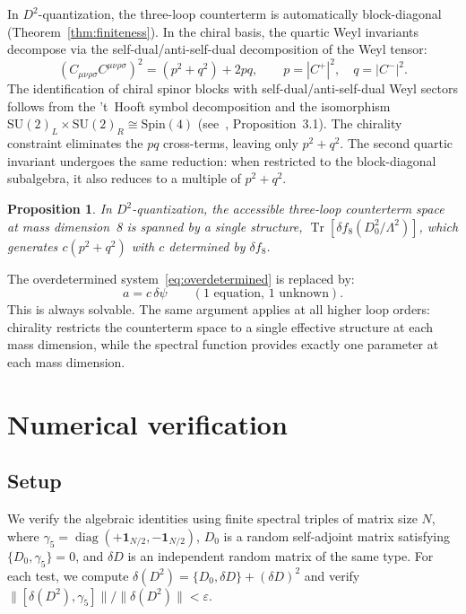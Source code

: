 \documentclass[12pt,a4paper]{article}
\newtheorem{proposition}[theorem]{Proposition}
\theoremstyle{definition}
\theoremstyle{remark}
\newcommand{\Weylsq}{C_{\mu\nu\rho\sigma}C^{\mu\nu\rho\sigma}}
\newcommand{\Tr}{\operatorname{Tr}}
\newcommand{\Lam}{\Lambda}
\begin{document}
In $D^2$-quantization, the three-loop counterterm is automatically
block-diagonal (Theorem~\ref{thm:finiteness}).  In the chiral basis, the
quartic Weyl invariants decompose via the self-dual/anti-self-dual
decomposition of the Weyl tensor:
\begin{equation}\label{eq:quartic_chiral}
  (\Weylsq)^2 = (p^2 + q^2) + 2pq, \qquad
  p = |C^+|^2, \quad q = |C^-|^2.
\end{equation}
The identification of chiral spinor blocks with self-dual/anti-self-dual
Weyl sectors follows from the 't~Hooft symbol decomposition and the
isomorphism $\mathrm{SU}(2)_L \times \mathrm{SU}(2)_R \cong
\mathrm{Spin}(4)$ (see~\cite{Alfyorov:2026ct}, Proposition~3.1).
The chirality constraint eliminates the $pq$ cross-terms, leaving only
$p^2 + q^2$.  The second quartic invariant undergoes the same reduction:
when restricted to the block-diagonal subalgebra, it also reduces to a
multiple of $p^2 + q^2$.

\begin{proposition}\label{prop:one_structure}
In $D^2$-quantization, the accessible three-loop counterterm space at mass
dimension~8 is spanned by a single structure, $\Tr[\delta f_8(D_0^2/\Lam^2)]$,
which generates $c(p^2 + q^2)$ with $c$ determined by $\delta f_8$.
\end{proposition}

The overdetermined system~\eqref{eq:overdetermined} is replaced by:
\begin{equation}\label{eq:determined}
  a = c\,\delta\psi \qquad (1\text{ equation, }1\text{ unknown}).
\end{equation}
This is always solvable.  The same argument applies at all higher loop orders:
chirality restricts the counterterm space to a single effective structure at
each mass dimension, while the spectral function provides exactly one parameter
at each mass dimension.

\section{Numerical verification}
\label{sec:numerics}

\subsection{Setup}

We verify the algebraic identities using finite spectral triples of matrix
size $N$, where $\gamma_5 = \operatorname{diag}(+\mathbf{1}_{N/2},
-\mathbf{1}_{N/2})$, $D_0$ is a random self-adjoint matrix satisfying
$\{D_0, \gamma_5\} = 0$, and $\delta D$ is an independent random matrix of
the same type.  For each test, we compute $\delta(D^2) = \{D_0, \delta D\}
+ (\delta D)^2$ and verify $\|[\delta(D^2), \gamma_5]\|/\|\delta(D^2)\|
< \varepsilon$.
\end{document}
